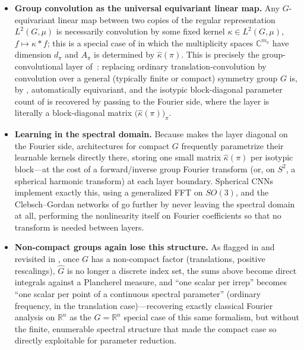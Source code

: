 \documentclass[mathematics,review,submit,moreauthors]{Definitions/mdpi}
\begin{document}
\begin{itemize}
    \item \textbf{Group convolution as the universal equivariant linear
    map.} Any $G$-equivariant linear map between two copies of the regular
    representation $L^2(G,\mu)$ is necessarily convolution by some fixed
    kernel $\kappa \in L^2(G,\mu)$, $f \mapsto \kappa * f$; this is a special
    case of  in which the multiplicity
    spaces $\mathbb{C}^{m_\pi}$ have dimension $d_\pi$ and $A_\pi$ is
    determined by $\widehat{\kappa}(\pi)$. This is precisely the
    group-convolutional layer of~\citep{cohen2014}: replacing ordinary
    translation-convolution by convolution over a general (typically finite
    or compact) symmetry group $G$ is, by
    , automatically equivariant,
    and the isotypic block-diagonal parameter count of
     is recovered by passing to the
    Fourier side, where the layer is literally a block-diagonal matrix
    $\bigl(\widehat{\kappa}(\pi)\bigr)_{\pi}$.
    \item \textbf{Learning in the spectral domain.} Because
     makes the layer diagonal on the Fourier
    side, architectures for compact $G$ frequently
    parametrize their learnable kernels directly there, storing one small
    matrix $\widehat{\kappa}(\pi)$ per
    isotypic block---at the cost of a forward/inverse group Fourier
    transform (or, on $S^2$, a spherical harmonic transform) at each layer
    boundary. Spherical CNNs \citep{cohen2018} implement exactly this,
    using a generalized FFT on $SO(3)$, and the Clebsch--Gordan networks
    of \citet{kondor2018p3icml} go further by never leaving the spectral
    domain at all, performing the nonlinearity itself on Fourier
    coefficients so that no transform is needed between layers.
    \item \textbf{Non-compact groups again lose this structure.} As
    flagged in  and revisited in
    , once $G$ has a non-compact
    factor (translations, positive rescalings), $\widehat{G}$ is no longer
    a discrete index set, the sums above become direct integrals against a
    Plancherel measure, and ``one scalar per irrep'' becomes ``one scalar per
    point of a continuous spectral parameter'' (ordinary frequency, in the
    translation case)---recovering exactly classical Fourier analysis on
    $\mathbb{R}^n$ as the $G = \mathbb{R}^n$ special case of this same
    formalism, but without the finite, enumerable spectral structure that
    made the compact case so directly exploitable for parameter reduction.
\end{itemize}
\end{document}
